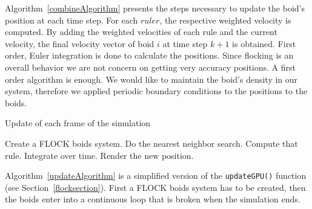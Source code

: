 Algorithm~\ref{combineAlgorithm} presents the steps necessary to update the boid's position at each time step. For each $rule r$, the respective weighted velocity is computed. By adding the weighted velocities of each rule and the current velocity, the final velocity vector of boid $i$ at time step $k+1$ is obtained. First order, Euler integration is done to calculate the positions. Since flocking is an overall behavior we are not concern on getting very accuracy positions. A first order algorithm is enough. We would like to maintain the boid's density in our system, therefore we applied periodic boundary conditions to the positions to the boids.
 
\begin{algorithm}
\caption{Update of each frame of the simulation}
\label{updateAlgorithm}
\begin{algorithmic}
\STATE Create a FLOCK boids system.
\STATE Do the nearest neighbor search.
\STATE Compute that rule.
\STATE Integrate over time.
\STATE Render the new position.
\ENDFOR
\end{algorithmic}
\end{algorithm}

Algorithm~\ref{updateAlgorithm} is a simplified version of the \texttt{updateGPU()} function (see Section~\ref{flocksection}). First a FLOCK boids system has to be created, then the boids enter into a continuous loop that is broken when the simulation ends. 
